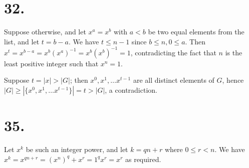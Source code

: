 \documentclass{article}
\begin{document}
\section*{32.}

Suppose otherwise, and let $x^a = x^b$ with $a < b$ be two equal elements from the list, and let $t = b-a$. We have $t \le n-1$ since $b \le n, 0 \le a$. Then $x^t = x^{b-a} = x^b (x^a)^{-1} = x^b (x^b)^{-1} = 1$, contradicting the fact that $n$ is the least positive integer such that $x^n = 1$.

Suppose $t = |x| > |G|$; then $x^0, x^1, \ldots x^{t-1}$ are all distinct elements of $G$, hence $|G| \ge |\{x^0, x^1, \ldots x^{t-1}\}| = t > |G|$, a contradiction.

\section*{35.}

Let $x^k$ be such an integer power, and let $k = qn + r$ where $0 \le r < n$. We have $x^k = x^{qn+r} = (x^n)^q + x^r = 1^q x^r = x^r$ as required.
\end{document}

